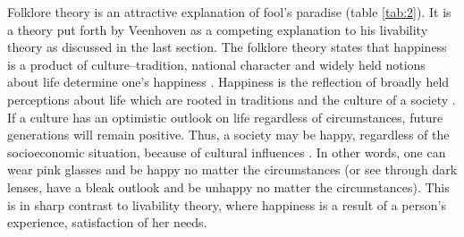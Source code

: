 \documentclass[10pt, letterpaper]{article}
\begin{document}
\begin{spacing}{2}
Folklore theory is an attractive explanation of fool's paradise (table
\ref{tab:2}). It is a theory put forth by Veenhoven as a competing explanation
to his livability theory as discussed in the last section. 
The folklore theory states that happiness is a product of culture--tradition,
national character and widely held notions about life determine one's
happiness \citep{veenhoven95}. Happiness is the reflection of broadly held
perceptions about life which are rooted in traditions and the culture of a
 society \citep{veenhoven95}.  %
If a culture has an optimistic outlook on
life regardless of  circumstances, future generations will remain
positive.  Thus, %
a society may be happy, regardless of the socioeconomic situation, because of cultural influences \citep{veenhoven95}.
 In other words, one can wear pink glasses and be
happy no matter the circumstances (or see through dark lenses, have a bleak
outlook and be unhappy no matter the circumstances). {This is in sharp contrast to
livability theory, where happiness is a result of a person's experience,
satisfaction of her needs.} 




\end{spacing}
\end{document}
